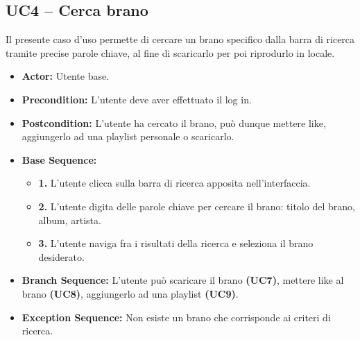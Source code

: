 \vspace{1cm}

\subsection{\textbf{UC4 -- Cerca brano}}
Il presente caso d'uso permette di cercare un brano specifico dalla barra di ricerca
tramite precise parole chiave, al fine di scaricarlo per poi riprodurlo in locale.
\begin{itemize}
    \item \textbf{Actor:} Utente base.
    \item \textbf{Precondition:} L'utente deve aver effettuato il log in.
    \item \textbf{Postcondition:} L'utente ha cercato il brano, può dunque mettere like, aggiungerlo ad una playlist personale o scaricarlo.
    \item \textbf{Base Sequence:}
    \begin{itemize}
        \item \textbf{1.} L'utente clicca sulla barra di ricerca apposita nell'interfaccia.
        \item \textbf{2.} L'utente digita delle parole chiave per cercare il brano: titolo del brano, album, artista.
        \item \textbf{3.} L'utente naviga fra i risultati della ricerca e seleziona il brano desiderato.
    \end{itemize}
    \item \textbf{Branch Sequence:} L'utente può scaricare il brano \textbf{(UC7)}, mettere like al brano \textbf{(UC8)}, aggiungerlo ad una playlist \textbf{(UC9)}.
    \item \textbf{Exception Sequence:} Non esiste un brano che corrisponde ai criteri di ricerca.
\end{itemize}

\vspace{0.5cm}

